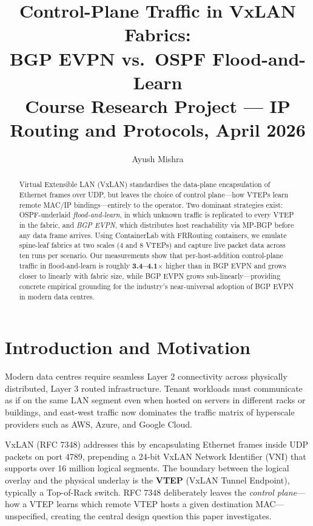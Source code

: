 \documentclass[10pt,twocolumn]{article}
\title{\textbf{Control-Plane Traffic in VxLAN Fabrics:\\BGP EVPN vs.\ OSPF Flood-and-Learn}\\[4pt]
\normalsize Course Research Project --- IP Routing and Protocols, April 2026}
\author{Ayush Mishra}
\date{}
\begin{document}
\maketitle
\thispagestyle{empty}

\begin{abstract}
Virtual Extensible LAN (VxLAN) standardises the data-plane encapsulation of
Ethernet frames over UDP, but leaves the choice of control plane---how VTEPs
learn remote MAC/IP bindings---entirely to the operator.  Two dominant
strategies exist: OSPF-underlaid \emph{flood-and-learn}, in which unknown
traffic is replicated to every VTEP in the fabric, and \emph{BGP EVPN}, which
distributes host reachability via MP-BGP before any data frame arrives.  Using
ContainerLab with FRRouting containers, we emulate spine-leaf fabrics at two
scales (4 and 8 VTEPs) and capture live packet data across ten runs per
scenario.  Our measurements show that per-host-addition control-plane traffic
in flood-and-learn is roughly \textbf{3.4--4.1$\times$} higher than in BGP
EVPN and grows closer to linearly with fabric size, while BGP EVPN grows
sub-linearly---providing concrete empirical grounding for the industry's
near-universal adoption of BGP EVPN in modern data centres.
\end{abstract}

\section{Introduction and Motivation}

Modern data centres require seamless Layer 2 connectivity across physically
distributed, Layer 3 routed infrastructure.  Tenant workloads must communicate
as if on the same LAN segment even when hosted on servers in different racks or
buildings, and east-west traffic now dominates the traffic matrix of
hyperscale providers such as AWS, Azure, and Google Cloud.

VxLAN (RFC 7348) addresses this by encapsulating Ethernet frames inside UDP
packets on port 4789, prepending a 24-bit VxLAN Network Identifier (VNI) that
supports over 16 million logical segments.  The boundary between the logical
overlay and the physical underlay is the \textbf{VTEP} (VxLAN Tunnel
Endpoint), typically a Top-of-Rack switch.  RFC 7348 deliberately leaves the
\emph{control plane}---how a VTEP learns which remote VTEP hosts a given
destination MAC---unspecified, creating the central design question this paper
investigates.
\end{document}
